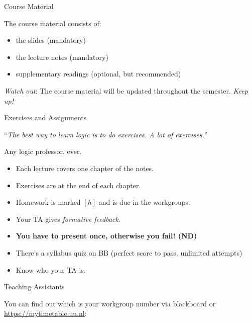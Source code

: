 \begin{frame}{Course Material}

	The course material consists of:

	\begin{itemize}[<+->]

		\item the slides (mandatory)

		\item the lecture notes (mandatory)

		\item supplementary readings (optional, but recommended)

	\end{itemize}

	\emph{Watch out}: The course material will be updated throughout the semester. \emph{Keep up!}

\end{frame}
\begin{frame}{Exercises and Assignments}

``{\it The best way to learn logic is to do exercises. A lot of exercises.}''
\begin{flushright}
Any logic professor, ever.
\end{flushright}

	\begin{itemize}[<+->]

		\item Each lecture covers one chapter of the notes.

		\item Exercises are at the end of each chapter.

		\item Homework is marked $[h]$ and is due in the workgroups.

		\item Your TA gives \emph{formative feedback}.

		\item \textbf{You have to present once, otherwise you fail! (ND)}

		\item There's a syllabus quiz on BB (perfect score to pass, unlimited attempts)

		\item Know who your TA is.

	\end{itemize}

\end{frame}

\begin{frame}{Teaching Assistants}

You can find out which is your workgroup number via blackboard or \url{https://mytimetable.uu.nl}:
{\small \begin{center}
\TAS
\end{center}}


\end{frame}

